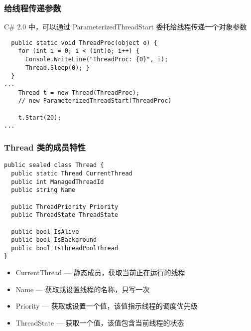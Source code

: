 \begin{frame}[fragile]
\frametitle{给线程传递参数}
C\# 2.0 中，可以通过 ParameterizedThreadStart 委托给线程传递一个对象参数
\begin{lstlisting}
  public static void ThreadProc(object o) {
    for (int i = 0; i < (int)o; i++) {
      Console.WriteLine("ThreadProc: {0}", i);
      Thread.Sleep(0); }
  }
...
    Thread t = new Thread(ThreadProc);
    // new ParameterizedThreadStart(ThreadProc)

    t.Start(20);
...
\end{lstlisting}
\end{frame}

\begin{frame}[fragile]
\frametitle{Thread 类的成员特性}
\begin{lstlisting}
public sealed class Thread {
  public static Thread CurrentThread
  public int ManagedThreadId
  public string Name

  public ThreadPriority Priority
  public ThreadState ThreadState

  public bool IsAlive
  public bool IsBackground
  public bool IsThreadPoolThread
}
\end{lstlisting}
\begin{itemize}
\item CurrentThread --- 静态成员，获取当前正在运行的线程
\item Name --- 获取或设置线程的名称，只写一次
\item Priority --- 获取或设置一个值，该值指示线程的调度优先级
\item ThreadState --- 获取一个值，该值包含当前线程的状态
\end{itemize}
\end{frame}


